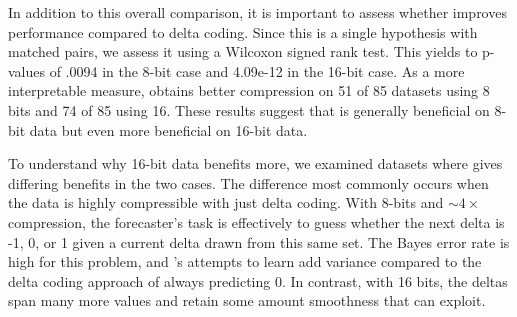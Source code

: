 In addition to this overall comparison, it is important to assess whether \fire improves performance compared to delta coding. Since this is a single hypothesis with matched pairs, we assess it using a Wilcoxon signed rank test. This yields to p-values of .0094 in the 8-bit case and 4.09e-12 in the 16-bit case. As a more interpretable measure, \fire obtains better compression on 51 of 85 datasets using 8 bits and 74 of 85 using 16. These results suggest that \fire is generally beneficial on 8-bit data but even more beneficial on 16-bit data.

To understand why 16-bit data benefits more, we examined datasets where \fire gives differing benefits in the two cases. The difference most commonly occurs when the data is highly compressible with just delta coding. With 8-bits and $\sim4\times$ compression, the forecaster's task is effectively to guess whether the next delta is -1, 0, or 1 given a current delta drawn from this same set. The Bayes error rate is high for this problem, and \fire's attempts to learn add variance compared to the delta coding approach of always predicting 0. In contrast, with 16 bits, the deltas span many more values and retain some amount smoothness that \fire can exploit.





